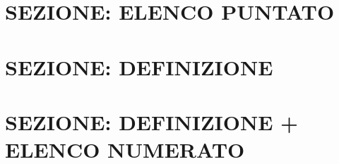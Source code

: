 \documentclass[aspectratio=1610]{beamer}
\begin{document}
\section{SEZIONE: ELENCO PUNTATO}


\section{SEZIONE: DEFINIZIONE}


\section{SEZIONE: DEFINIZIONE + ELENCO NUMERATO}

\end{document}
